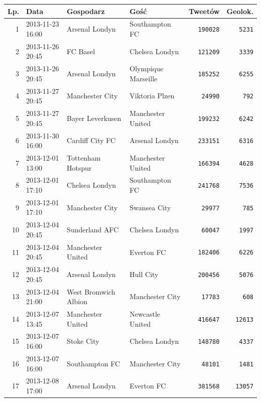 \clearpage

\begin{table}[ht!]  
\begin{center}  
\begin{tabular}{|r|l|l|l|r|r|}
\hline
Lp. & Data & Gospodarz & Gość & Tweetów & Geolok.
\\ \hline 
1 & 2013-11-23 16:00 & Arsenal Londyn & Southampton FC & \texttt{190028} & \texttt{5231}	\\ \hline
2 & 2013-11-26 20:45 & FC Basel & Chelsea Londyn & \texttt{121209} & \texttt{3339}	\\ \hline
3 & 2013-11-26 20:45 & Arsenal Londyn & Olympique Marseille & \texttt{185252} & \texttt{6255}	\\ \hline
4 & 2013-11-27 20:45 & Manchester City & Viktoria Plzen & \texttt{24990} & \texttt{792}	\\ \hline
5 & 2013-11-27 20:45 & Bayer Leverkusen & Manchester United & \texttt{199232} & \texttt{6242}	\\ \hline
6 & 2013-11-30 16:00 & Cardiff City FC & Arsenal Londyn & \texttt{233151} & \texttt{6316}	\\ \hline
7 & 2013-12-01 13:00 & Tottenham Hotspur & Manchester United & \texttt{166394} & \texttt{4628}	\\ \hline
8 & 2013-12-01 17:10 & Chelsea Londyn & Southampton FC & \texttt{241768} & \texttt{7536}	\\ \hline
9 & 2013-12-01 17:10 & Manchester City & Swansea City & \texttt{29977} & \texttt{785}	\\ \hline
10 & 2013-12-04 20:45 & Sunderland AFC & Chelsea Londyn & \texttt{60047} & \texttt{1997}	\\ \hline
11 & 2013-12-04 20:45 & Manchester United & Everton FC & \texttt{182406} & \texttt{6226}	\\ \hline
12 & 2013-12-04 20:45 & Arsenal Londyn & Hull City & \texttt{200456} & \texttt{5076}	\\ \hline
13 & 2013-12-04 21:00 & West Bromwich Albion & Manchester City & \texttt{17783} & \texttt{608}	\\ \hline
14 & 2013-12-07 13:45 & Manchester United & Newcastle United & \texttt{416647} & \texttt{12613}	\\ \hline
15 & 2013-12-07 16:00 & Stoke City & Chelsea Londyn & \texttt{148780} & \texttt{4337}	\\ \hline
16 & 2013-12-07 16:00 & Southampton FC & Manchester City & \texttt{48101} & \texttt{1481}	\\ \hline
17 & 2013-12-08 17:00 & Arsenal Londyn & Everton FC & \texttt{381568} & \texttt{13057}	\\ \hline

\end{tabular}
\end{center}
\end{table}
